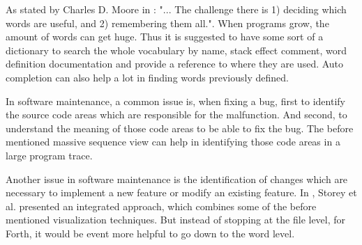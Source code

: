As stated by \gls{Charles D. Moore} in \cite{Biancuzzi:2009:MPC:1592983}: "... The challenge there is 1) deciding which words are useful, and 2) remembering them all.". When programs grow, the amount of words can get huge. Thus it is suggested to have some sort of a dictionary to search the whole vocabulary by name, stack effect comment, word definition documentation and provide a reference to where they are used. Auto completion can also help a lot in finding words previously defined.

In software maintenance, a common issue is, when fixing a bug, first to identify the source code areas which are responsible for the malfunction. And second, to understand the meaning of those code areas to be able to fix the bug. The before mentioned massive sequence view can help in identifying those code areas in a large program trace.

Another issue in software maintenance is the identification of changes which are necessary to implement a new feature or modify an existing feature. In \cite{Storey:1997:IVT:857188.857642}, Storey et al. presented an integrated approach, which combines some of the before mentioned visualization techniques. But instead of stopping at the file level, for Forth, it would be event more helpful to go down to the word level.

\begin{comment}
\begin{itemize}
\item keeping the mental model up to date
\item keeping artifacts up to date
\end{itemize}
\end{comment}

\begin{comment}
\begin{itemize}

\item other data structures and variables should be displayed
	\begin{itemize}
	\item memory maybe like \cite{ReissProgrammingEnvironments1995} or \cite{Aftandilian:2010:HIH:1879211.1879222} but since there is no underlying object orientation and no standardized oo system this would be hard do accomplish
	\end{itemize}

\item interactive program manipulation: state of the system before a word, after a word and by clicking on the word jumping to its definition or inserting it and there also providing those features

\item goal-oriented strategy: the definition of an execution scenario such that only the parts of interest of the software system are analyzed (Koenemann and Robertson, 1991; Zaidman,
2006).

\end{itemize}
\end{comment}